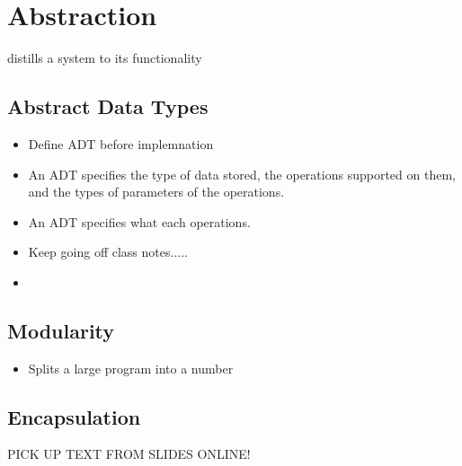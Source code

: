 \documentclass{article}
\begin{document}
\section{Abstraction}
distills a system to its functionality
\subsection{Abstract Data Types}
\begin{itemize}
\item Define ADT before implemnation
\item An ADT specifies the type of data stored, the operations supported on them, and the types of parameters of the operations.
\item An ADT specifies what each operations.
\item Keep going off class notes.....\item
\end{itemize}

\subsection{Modularity}
\begin{itemize}
\item Splits a large program into a number
\end{itemize}

\subsection{Encapsulation}
PICK UP TEXT FROM SLIDES ONLINE!
\end{document}
